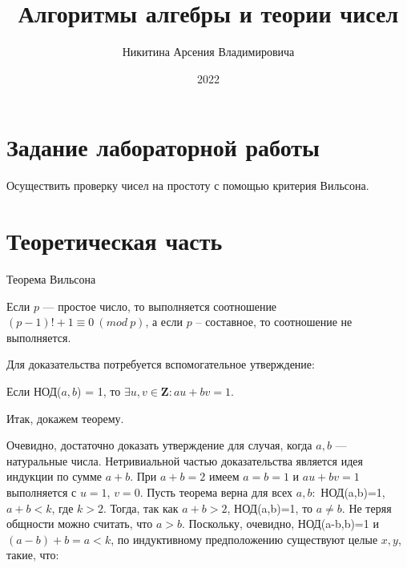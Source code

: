 \documentclass[bachelor, och, labwork]{shiza}
\begin{document}
\title{Алгоритмы алгебры и теории чисел}





\author{Никитина Арсения Владимировича}




\date{2022}

\maketitle



\tableofcontents

\section{Задание лабораторной работы}

Осуществить проверку чисел на простоту с помощью критерия Вильсона.

\section{Теоретическая часть}

\begin{center}
    Теорема Вильсона
\end{center}

Если $p$ --- простое число, то выполняется соотношение $(p-1)!+1\equiv 0~(mod~ p)$, 
а если $p$ -- составное, то соотношение не выполняется.

Для доказательства потребуется вспомогательное утверждение: 

Если НОД($a,b$) = 1, то $\exists u,v\in \mathbf{Z} : au + bv = 1$.

Итак, докажем теорему.

Очевидно, достаточно доказать утверждение для случая, когда $a, b$ --- натуральные 
числа. Нетривиальной частью доказательства является идея индукции по сумме $a+b$. 
При $a+b=2$ имеем $a=b=1$ и $au + bv = 1$ выполняется с $u=1$, $v=0$. Пусть 
теорема верна для всех $a, b:$ НОД(a,b)=1, $a+b<k$, где $k>2$. Тогда, так как $a+b>2$, 
НОД(a,b)=1, то $a \not=b $. Не теряя общности можно считать, что $a>b$. 
Поскольку, очевидно, НОД(a-b,b)=1 и $(a-b)+b=a<k$, по индуктивному предположению 
существуют целые $x, y$, такие, что:
\end{document}
